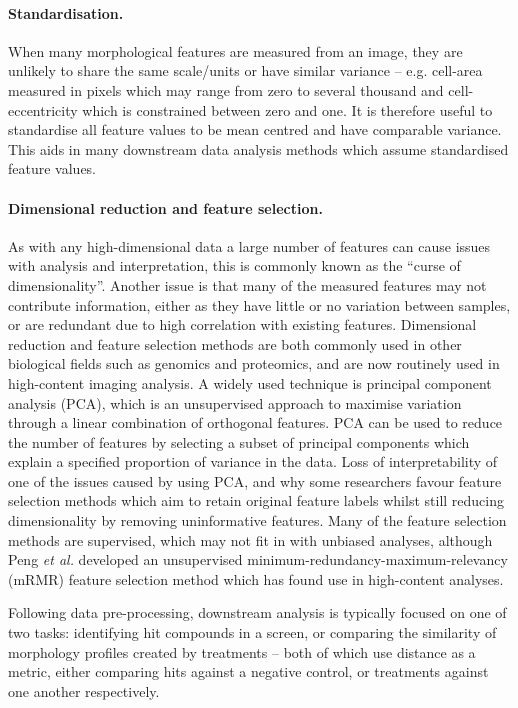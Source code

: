 \documentclass[a4paper,11pt,twoside,openright]{scrbook}
\begin{document}
\paragraph{Standardisation.}
When many morphological features are measured from an image, they are unlikely to share the same scale/units or have similar variance -- e.g. cell-area measured in pixels which may range from zero to several thousand and cell-eccentricity which is constrained between zero and one.
It is therefore useful to standardise all feature values to be mean centred and have comparable variance.
This aids in many downstream data analysis methods which assume standardised feature values.

\paragraph{Dimensional reduction and feature selection.}
As with any high-dimensional data a large number of features can cause issues with analysis and interpretation, this is commonly known as the ``curse of dimensionality''.
Another issue is that many of the measured features may not contribute information, either as they have little or no variation between samples, or are redundant due to high correlation with existing features.
Dimensional reduction and feature selection methods are both commonly used in other biological fields such as genomics and proteomics, and are now routinely used in high-content imaging analysis.
A widely used technique is principal component analysis (PCA), which is an unsupervised approach to maximise variation through a linear combination of orthogonal features.
PCA can be used to reduce the number of features by selecting a subset of principal components which explain a specified proportion of variance in the data.
Loss of interpretability of one of the issues caused by using PCA, and why some researchers favour feature selection methods which aim to retain original feature labels whilst still reducing dimensionality by removing uninformative features.
Many of the feature selection methods are supervised, which may not fit in with unbiased analyses, although Peng \textit{et al.} developed an unsupervised minimum-redundancy-maximum-relevancy (mRMR) feature selection method which has found use in high-content analyses. \cite{Peng2005}\newline


Following data pre-processing, downstream analysis is typically focused on one of two tasks: identifying hit compounds in a screen, or comparing the similarity of morphology profiles created by treatments -- both of which use distance as a metric, either comparing hits against a negative control, or treatments against one another respectively.
\end{document}
